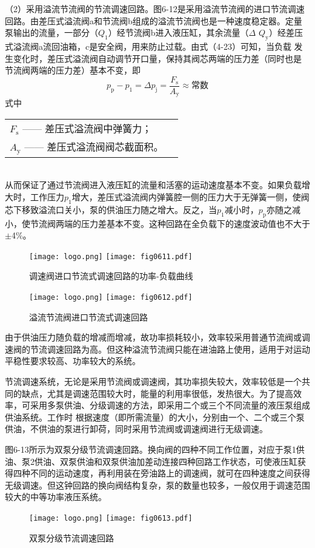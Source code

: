 （2）采用溢流节流阀的节流调速回路。图6-12是采用溢流节流阀的进口节流调速回路。由差压式溢流阀a和节流阀b组成的溢流节流阀也是一种速度稳定器。定量泵输出的流量，一部分（$Q_\text{1}$）经节流阀b进入液压缸，其余流量（$\Delta$ $Q_\text{y}$）经差压式溢流阀a流回油箱，c是安全阀，用来防止过载。由式（4-23）可知，当负载 发生变化时，差压式溢流阀自动调节开口量，保持其阀芯两端的压力差（同时也是 节流阀两端的压力差）基本不变，即
\begin{equation}
p_\text{p}-p_\text{1}=\Delta p_\text{j}=\frac{F_\text{s}}{A_\text{y}}\approx\text{常数}
\end{equation}
\noindent 式中\  
\begin{tabular}[t]{ll}
$F_\text{s}$ ——\hspace{1mm} 差压式溢流阀中弹簧力；\\
$A_\text{y}$ ——\hspace{1mm} 差压式溢流阀阀芯截面积。
\end{tabular}\\
从而保证了通过节流阀进入液压缸的流量和活塞的运动速度基本不变。如果负载增大时，工作压力$p_\text{1}$增大，差压式溢流阀内弹簧腔一侧的压力大于无弹簧一侧，使阀芯下移致溢流口关小，泵的供油压力随之增大。反之，当$p_\text{1}$减小时，$p_\text{p}$亦随之减小，使节流阀两端的压力差基本不变。这种回路在全负载下的速度波动值也不大于$\pm$4\%。
\begin{figure}\centering
\ifOpenSource
\texttt{[image: logo.png]}
\else
\texttt{[image: fig0611.pdf]}
\fi
\caption{调速阀进口节流式调速回路的功率-负载曲线}
\label{fig:fig0611}
\end{figure}
\begin{figure}\centering
\ifOpenSource
\texttt{[image: logo.png]}
\else
\texttt{[image: fig0612.pdf]}
\fi
\caption{溢流节流阀进口节流式调速回路}
\label{fig:fig0612}
\end{figure}

由于供油压力随负载的增减而增减，故功率损耗较小，效率较采用普通节流阀或调速阀的节流调速回路为高。但这种溢流节流阀只能在进油路上使用，适用于对运动平稳性要求较高、功率较大的系统。

节流调速系统，无论是采用节流阀或调速阀，其功率损失较大，效率较低是一个共同的缺点，尤其是调速范围较大时，能量的利用率很低，发热很大。为了提高效率，可采用多泵供油、分级调速的方法，即采用二个或三个不同流量的液压泵组成供油系统。工作时 根据速度（即所需流量）的大小，分别由一个、二个或三个泵供油，不供油的泵进行卸荷，同时采用节流阀或调速阀进行无级调速。

图6-13所示为双泵分级节流调速回路。换向阀的四种不同工作位置，对应于泵1供油、泵2供油、双泵供油和双泵供油加差动连接四种回路工作状态，可使液压缸获得四种不同的运动速度，再利用装在旁油路上的调速阀，就可在四种速度之间获得无级调速。但这钟回路的换向阀结构复杂，泵的数量也较多，一般仅用于调速范围较大的中等功率液压系统。
\begin{figure}\centering
\ifOpenSource
\texttt{[image: logo.png]}
\else
\texttt{[image: fig0613.pdf]}
\fi
\caption{双泵分级节流调速回路}
\label{fig:fig0613}
\end{figure}
